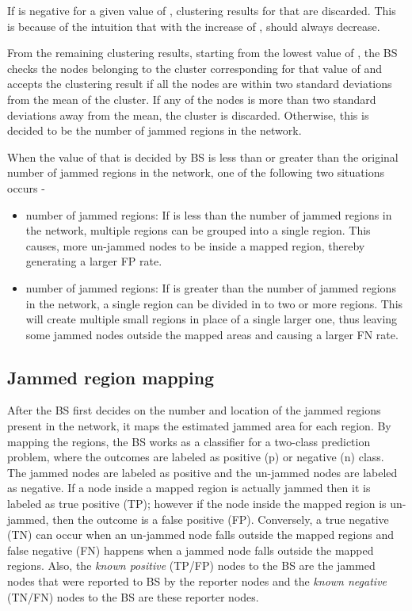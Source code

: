 \documentclass[conference]{IEEEtran}
\begin{document}
\noindent If  is negative for a given value of , clustering results for that  are discarded. This is because of the intuition that with the increase of ,  should always decrease.

From the remaining clustering results, starting from the lowest value of , the BS checks the nodes belonging to the cluster corresponding for that value of  and accepts the clustering result if all the nodes are within two standard deviations from the mean of the cluster. If any of the nodes is more than two standard deviations away from the mean, the cluster is discarded. Otherwise, this  is decided to be the number of jammed regions in the network. 

When the value of  that is decided by BS is less than or greater than the original number of jammed regions in the network, one of the following two situations occurs - 
\begin{itemize}
\item
 number of jammed regions: If  is less than the number of jammed regions in the network, multiple regions can be grouped into a single region. This causes, more un-jammed nodes to be inside a mapped region, thereby generating a larger FP rate. \item
 number of jammed regions: If  is greater than the number of jammed regions in the network, a single region can be divided in to two or more regions. This will create multiple small regions in place of a single larger one, thus leaving some jammed nodes outside the mapped areas and causing a larger FN rate. \end{itemize}

\subsection{Jammed region mapping}

After the BS first decides on the number and location of the jammed regions present in the network, it maps the estimated jammed area for each region. By mapping the regions, the BS works as a classifier for a two-class prediction problem, where the outcomes are labeled as positive (p) or negative (n) class. The jammed nodes are labeled as positive and the un-jammed nodes are labeled as negative. If a node inside a mapped region is actually jammed then it is labeled as true positive (TP); however if the node inside the mapped region is un-jammed, then the outcome is a false positive (FP). Conversely, a true negative (TN) can occur when an un-jammed node falls outside the mapped regions and false negative (FN) happens when a jammed node falls outside the mapped regions. Also, the \emph{known positive} (TP/FP) nodes to the BS are the jammed nodes that were reported to BS by the reporter nodes and the \emph{known negative} (TN/FN) nodes to the BS are these reporter nodes. 
\end{document}
